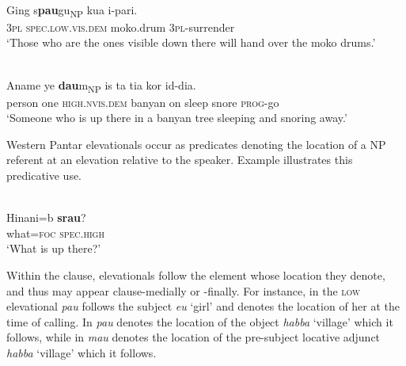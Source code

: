 \enlargethispage{1em}
\ea%
\label{ex:7:30}
 \\
\gll   {\ob}Ging  s\textbf{pau}gu{\cb}\textsubscript{NP} kua{\ng}  i-pari{\ng}.\\
    \textsc{3pl} \textsc{spec.low.vis.dem} moko.drum  \textsc{3pl-}surrender\\
\glt `Those who are the ones visible down there will hand over the moko drums.'
\z



 
  



\ea%
\label{ex:7:31}
 \\
\gll {\ob}Aname  ye  \textbf{dau}m{\cb}\textsubscript{NP} is   ta{\ng} ti{\textglotstop}a{\ng} kor  id-dia.\\
    person  one  \textsc{high.}\textsc{nvis.dem} banyan  on  sleep  snore  \textsc{prog}{}-go\\
\glt `Someone who is up there in a banyan tree sleeping and snoring away.'
\z

  
 

  

Western Pantar elevationals occur as predicates denoting the location of a NP referent at an elevation relative to the speaker. Example  illustrates this predicative use. 

 

\ea%
\label{ex:7:32}
 \\
\gll  Hinani=b  \textbf{{srau}}{?} \\
   what=\textsc{foc} \textsc {spec.high}  \\
\glt `What is up there?'  
\z

 

 

  

Within the clause, elevationals follow the element whose location they denote, and thus may appear clause-medially or -finally. For instance, in  the \textsc{low} elevational \textit{pau} follows the subject \textit{eu} `girl' and denotes the location of her at the time of calling. In  \textit{pau} denotes the location of the object \textit{habba{\ng}} `village' which it follows, while in  \textit{mau} denotes the location of the pre-subject locative adjunct \textit{habba{\ng}} `village' which it follows.

